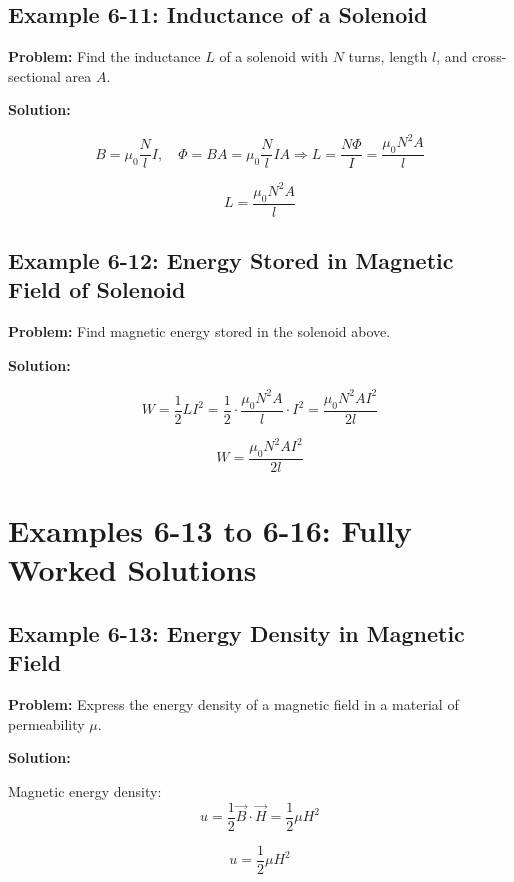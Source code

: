\documentclass[12pt]{article}
\begin{document}
\subsection*{Example 6-11: Inductance of a Solenoid}

\textbf{Problem:}  
Find the inductance \( L \) of a solenoid with \( N \) turns, length \( l \), and cross-sectional area \( A \).

\textbf{Solution:}

\[
B = \mu_0 \frac{N}{l} I, \quad \Phi = B A = \mu_0 \frac{N}{l} I A
\Rightarrow L = \frac{N \Phi}{I} = \frac{\mu_0 N^2 A}{l}
\]

\begin{tcolorbox}
\[
\boxed{L = \frac{\mu_0 N^2 A}{l}}
\]
\end{tcolorbox}

\subsection*{Example 6-12: Energy Stored in Magnetic Field of Solenoid}

\textbf{Problem:}  
Find magnetic energy stored in the solenoid above.

\textbf{Solution:}

\[
W = \frac{1}{2} L I^2 = \frac{1}{2} \cdot \frac{\mu_0 N^2 A}{l} \cdot I^2
= \frac{\mu_0 N^2 A I^2}{2l}
\]

\begin{tcolorbox}
\[
\boxed{W = \frac{\mu_0 N^2 A I^2}{2l}}
\]
\end{tcolorbox}



\section*{Examples 6-13 to 6-16: Fully Worked Solutions}

\subsection*{Example 6-13: Energy Density in Magnetic Field}

\textbf{Problem:}  
Express the energy density of a magnetic field in a material of permeability \( \mu \).

\textbf{Solution:}

Magnetic energy density:
\[
u = \frac{1}{2} \vec{B} \cdot \vec{H} = \frac{1}{2} \mu H^2
\]

\begin{tcolorbox}
\[
\boxed{u = \frac{1}{2} \mu H^2}
\]
\end{tcolorbox}
\end{document}
